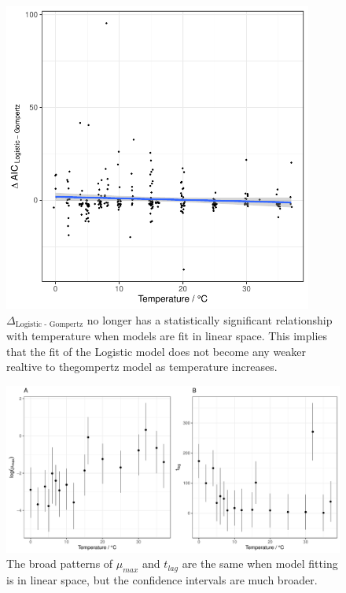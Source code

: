 \documentclass[11pt, a4paper]{article}
\begin{document}
                                \begin{figure}[H]
        \includegraphics[width=4in]{../results/logistic_vs_gompertz_temp_linear.pdf}
        \centering
        \caption{$\Delta_{\text{Logistic - Gompertz}}$ no longer has a statistically significant relationship with temperature when models are fit in linear space. This implies that the fit of the Logistic model does not become any weaker realtive to thegompertz model as temperature increases.}
        \label{sup:logistic_temp_linear}
        \end{figure} 
        
                                        \begin{figure}[H]
        \includegraphics[width=\linewidth]{../results/tlags_linear.pdf}
        \centering
        \caption{The broad patterns of $\mu_{max}$ and $t_{lag}$ are the same when model fitting is in linear space, but the confidence intervals are much broader.}
        \label{sup:params_linear}
        \end{figure} 
        
        
    
    
\end{document}
